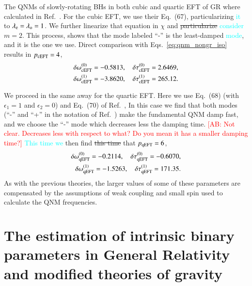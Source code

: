 \documentclass[twocolumn,
               prd,
               aps,
               superscriptaddress,
               tightenlines,
               nofootinbib,
               eqsecnum,
               amsfonts,
               amsmath,
               longbibliography]{revtex4-1}
\newcommand{\lame}{\lambda_{\rm e}}
\newcommand{\lamo}{\lambda_{\rm o}}
\newcommand{\ab}[1]{{\textcolor{cyan}{{#1}}}}
\newcommand{\abcomm}[1]{{\textcolor{red}{{[AB: #1]}}}}
\begin{document}
The QNMs of slowly-rotating BHs in both cubic and quartic EFT of GR where calculated in Ref.~\cite{Cano:2021myl}.
%
For the cubic EFT, we use their Eq.~(67), particularizing \ab{it} to $\lame = \lamo = 1$.
%
We further linearize that equation in $\chi$ and \sout{particularize} \ab{consider} $m=2$.
%
This process, shows that the mode labeled ``-'' is the least-damped \ab{mode}, and it is the one we use.
%
Direct comparison with Eqs.~\eqref{eq:qnm_nongr_iso} results in $p_{\rm cEFT} = 4$,
%
\begin{align}
    \delta \omega_{\rm cEFT}^{(0)} = - 0.5813, \quad \delta \tau_{\rm cEFT}^{(0)} = 2.6469,
    \nonumber \\
    \delta \omega_{\rm cEFT}^{(1)} = -3.8620, \quad \delta \tau_{\rm cEFT}^{(1)} = 265.12.
\end{align}

We proceed in the same away for the quartic EFT. Here we use Eq.~(68) (with
$\epsilon_{1} = 1$ and $\epsilon_{2} = 0$) and Eq.~(70) of
Ref.~\cite{Cano:2021myl},
%
In this case we find that both modes (``-'' and ``+'' in the notation of Ref.~\cite{Cano:2020cao}) make the
fundamental QNM damp fast, and we choose the ``-'' mode which decreases less the damping time. \abcomm{Not clear.
Decreases less with respect to what? Do you mean it has a smaller damping time?}
%
\ab{This time we} then find \sout{this time} that $p_{\rm qEFT} = 6$,
%
\begin{align}
    \delta \omega_{\rm qEFT}^{(0)} = -0.2114, \quad \delta \tau_{\rm qEFT}^{(0)} = -0.6070,
    \nonumber \\
    \delta \omega_{\rm qEFT}^{(1)} = -1.5263, \quad \delta \tau_{\rm qEFT}^{(1)} = 171.35.
\end{align}
%
As with the previous theories, the larger values of some of these parameters are compensated
by the assumptions of weak coupling and small spin used to calculate the QNM frequencies.
\
\section{The estimation of  intrinsic binary parameters in General Relativity and modified theories of gravity}
\label{app:big_contour}
\end{document}
